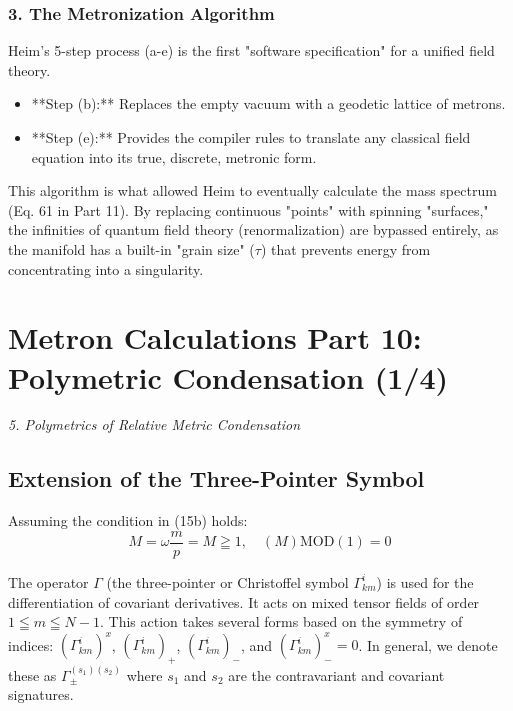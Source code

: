 \documentclass[11pt,a4paper,oneside]{article}
\begin{document}
\subsubsection*{3. The Metronization Algorithm}
Heim’s 5-step process (a-e) is the first "software specification" for a unified field theory.
\begin{itemize}
    \item **Step (b):** Replaces the empty vacuum with a geodetic lattice of metrons.
    \item **Step (e):** Provides the compiler rules to translate any classical field equation into its true, discrete, metronic form.
\end{itemize}
This algorithm is what allowed Heim to eventually calculate the mass spectrum (Eq. 61 in Part 11). By replacing continuous "points" with spinning "surfaces," the infinities of quantum field theory (renormalization) are bypassed entirely, as the manifold has a built-in "grain size" ($\tau$) that prevents energy from concentrating into a singularity. 
\section{Metron Calculations Part 10: Polymetric Condensation (1/4)}
\textit{5. Polymetrics of Relative Metric Condensation}

\subsection{Extension of the Three-Pointer Symbol}

Assuming the condition in (15b) holds:
\begin{equation}
    M = \omega \frac{m}{p} = M \geqq 1, \quad (M)\text{MOD}(1) = 0 \tag{15b}
\end{equation}

The operator $\Gamma$ (the three-pointer or Christoffel symbol $\Gamma^i_{km}$) is used for the differentiation of covariant derivatives. It acts on mixed tensor fields of order $1 \leqq m \leqq N-1$. This action takes several forms based on the symmetry of indices: $(\Gamma^i_{km})^x$, $(\Gamma^i_{km})_+$, $(\Gamma^i_{km})_-$, and $(\Gamma^i_{km})^x_- = 0$. In general, we denote these as $\Gamma^{(s_1)(s_2)}_{\pm}$ where $s_1$ and $s_2$ are the contravariant and covariant signatures.
\end{document}
